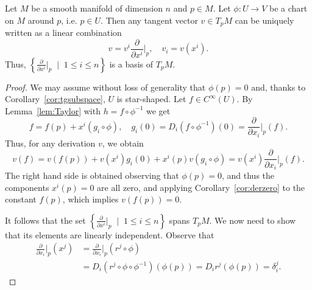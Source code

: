 \begin{prop}
    Let $M$ be a smooth manifold of dimension $n$ and $p\in M$.
    Let $\phi: U \to V$ be a chart on $M$ around $p$, i.e. $p\in U$.
    Then any tangent vector $v\in T_p M$ can be uniquely written as a linear combination
    \begin{equation}
        v = v^i \frac{\partial}{\partial x^i}\Big|_p, \quad v_i = v(x^i).
    \end{equation}
    Thus, $\left\{\frac{\partial}{\partial x^i}\Big|_p\;\mid\; 1\leq i\leq n\right\}$ is a basis of $T_p M$.
\end{prop}
\begin{proof}
    We may assume without loss of generality that $\phi(p) = 0$ and, thanks to Corollary~\ref{cor:tgsubspace}, $U$ is star-shaped.
    Let $f\in C^\infty(U)$.
    By Lemma~\ref{lem:Taylor} with $h = f \circ \phi^{-1}$ we get
    \begin{equation}
        f = f(p) + x^i (g_i \circ \phi),
        \quad g_i(0) = D_i (f \circ \phi^{-1})(0) = \frac{\partial}{\partial x_i}\Big|_p(f).
    \end{equation}
    Thus, for any derivation $v$, we obtain
    \begin{equation}
        v(f) = v(f(p)) + v(x^i)g_i(0) + x^i(p) v(g_i\circ\phi) = v(x^i)  \frac{\partial}{\partial x_i}\Big|_p(f).
    \end{equation}
    The right hand side is obtained observing that $\phi(p) = 0$, and thus the components $x^i(p) = 0$ are all zero, and applying Corollary~\ref{cor:derzero} to the constant $f(p)$, which implies $v(f(p)) = 0$.
    
    It follows that the set $\left\{\frac{\partial}{\partial x^i}\Big|_p\;\mid\; 1\leq i\leq n\right\}$ spans $T_p M$.
    We now need to show that its elements are linearly independent.
    Observe that
    \begin{align}
        \frac{\partial}{\partial x_i}\Big|_p (x^j) &= 
        \frac{\partial}{\partial x_i}\Big|_p (r^j \circ \phi)\\
        &= D_i (r^j \circ \phi \circ \phi^{-1}) (\phi(p))
        = D_i r^j(\phi(p)) = \delta^j_i.
    \end{align}
\end{proof}
\textcolor{red}{\hrulefill}

